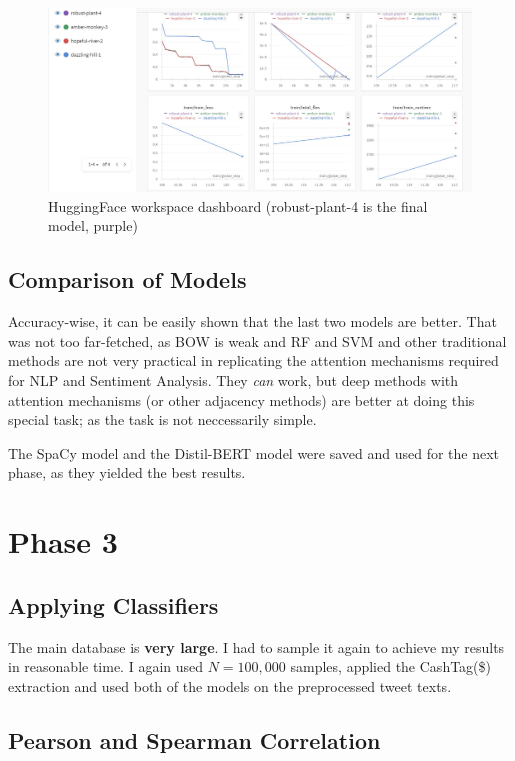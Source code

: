 \documentclass[12pt]{article}
\begin{document}
\begin{figure}[h!]
    \centering
    \includegraphics[width=1\textwidth]{P2.Distil-BERT.jpg}
    \caption{HuggingFace workspace dashboard (robust-plant-4 is the final model, purple)}
    \label{fig:P2.DistilBERT}
\end{figure}

\subsection{Comparison of Models}

Accuracy-wise, it can be easily shown that the last two models are better.
That was not too far-fetched, as BOW is weak and RF and SVM and other
traditional methods are not very practical in replicating the attention
mechanisms required for NLP and Sentiment Analysis. They \textit{can} work,
but deep methods with attention mechanisms (or other adjacency methods)
are better at doing this special task; as the task is not neccessarily simple.

The SpaCy model and the Distil-BERT model were saved and used for the next phase,
as they yielded the best results.

\pagebreak

\section{Phase 3}

\subsection{Applying Classifiers}

The main database is \textbf{very large}. I had to sample it again
to achieve my results in reasonable time. I again used $N=100,000$
samples, applied the CashTag(\$) extraction and used both of the
models on the preprocessed tweet texts.

\subsection{Pearson and Spearman Correlation}
\end{document}
